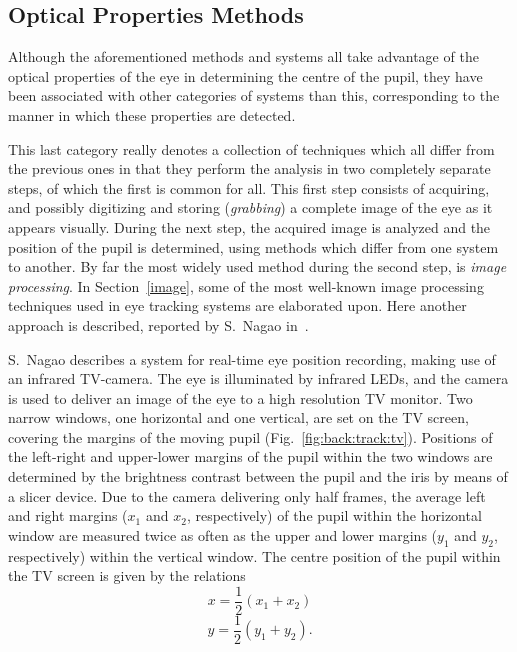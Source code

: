 \subsection{Optical Properties Methods}
\label{back:track:tv}

Although the aforementioned methods and systems all take advantage of
the optical properties of the eye in determining the centre of the
pupil, they have been associated with other categories of systems than
this, corresponding to the manner in which these properties are
detected.

This last category really denotes a collection of techniques which all
differ from the previous ones in that they perform the analysis in two
completely separate steps, of which the first is common for all.  This
first step consists of acquiring, and possibly digitizing and storing
({\em grabbing\/}) a complete image of the eye as it appears visually.
During the next step, the acquired image is analyzed and the position
of the pupil is determined, using methods which differ from one system
to another.  By far the most widely used method during the second
step, is {\em image processing\/}.  In Section~\ref{image}, some of
the most well-known image processing techniques used in eye tracking
systems are elaborated upon.  Here another approach is described,
reported by S.\ Nagao in~\cite{tv}.

S.\ Nagao describes a system for real-time eye position recording,
making use of an infrared TV-camera.  The eye is illuminated by
infrared LEDs, and the camera is used to deliver an image of the eye
to a high resolution TV monitor.  Two narrow windows, one horizontal
and one vertical, are set on the TV screen, covering the margins of
the moving pupil (Fig.~\ref{fig:back:track:tv}).  Positions of the
left-right and upper-lower margins of the pupil within the two windows
are determined by the brightness contrast between the pupil and the
iris by means of a slicer device.  Due to the camera delivering only
half frames, the average left and right margins ($x_{1}$ and $x_{2}$,
respectively) of the pupil within the horizontal window are measured
twice as often as the upper and lower margins ($y_{1}$ and $y_{2}$,
respectively) within the vertical window.  The centre position of the
pupil within the TV screen is given by the relations
\[x=\frac{1}{2}(x_{1}+x_{2})\] \[y=\frac{1}{2}(y_{1}+y_{2})\mbox{.}\]


